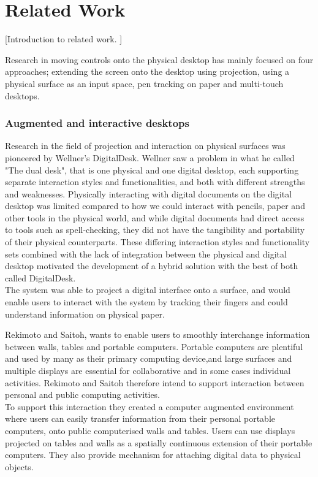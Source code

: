 \chapter{Related Work} %
\label{cha:related_work}
[Introduction to related work. ]

Research in moving controls onto the physical desktop has mainly focused on four approaches; extending the screen onto the desktop using projection, using a physical surface as an input space, pen tracking on paper and multi-touch desktops.



\subsection{Augmented and interactive desktops} %
\label{sub:aug}

Research in the field of projection and interaction on physical surfaces was pioneered by Wellner’s DigitalDesk\cite{wellner1993interacting}. Wellner saw a problem in what he called "The dual desk", that is one physical and one digital desktop, each supporting separate interaction styles and functionalities, and both with different strengths and weaknesses. Physically interacting with digital documents on the digital desktop was limited compared to how we could interact with pencils, paper and other tools in the physical world, and while digital documents had direct access to tools such as spell-checking, they did not have the tangibility and portability of their physical counterparts. These differing interaction styles and functionality sets combined with the lack of integration between the physical and digital desktop motivated the development of a hybrid solution with the best of both called DigitalDesk.\\
The system was able to project a digital interface onto a surface, and would enable users to interact with the system by tracking their fingers and could understand information on physical paper.

Rekimoto and Saitoh\cite{rekimoto1999augmented}, wants to enable users to smoothly interchange information between walls, tables and portable computers. Portable computers are plentiful and used by many as their primary computing device,and large surfaces and multiple displays are essential for collaborative and in some cases individual activities. Rekimoto and Saitoh therefore intend to support interaction between personal and public computing activities. \\
To support this interaction they created a computer augmented environment where users can easily transfer information from their personal portable computers, onto public computerised walls and tables. Users can use displays projected on tables and walls as a spatially continuous extension of their portable computers. They also provide mechanism for attaching digital data to physical objects.



